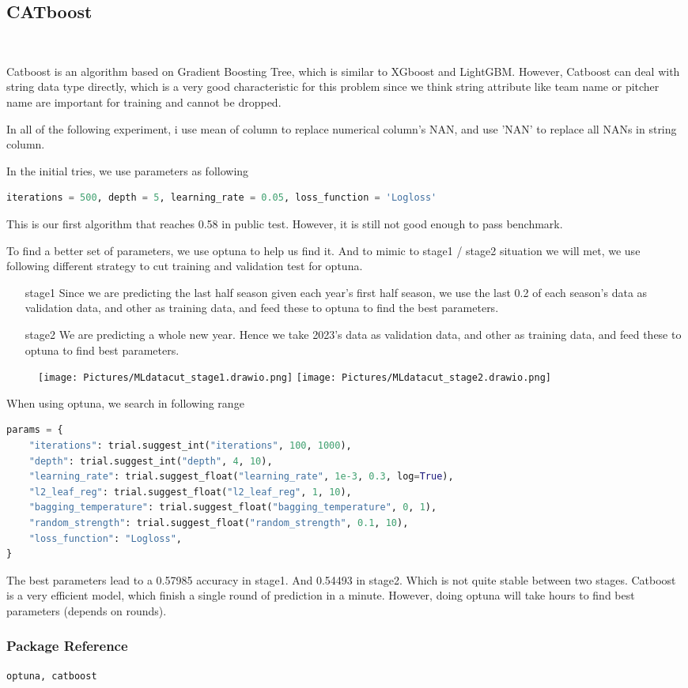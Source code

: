 \subsection*{CATboost}
\ \par Catboost is an algorithm based on Gradient Boosting Tree, which is similar to XGboost and LightGBM. However, Catboost can deal with string data type directly, which is a very good characteristic for this problem since we think string attribute like team name or pitcher name are important for training and cannot be dropped. 
\par In all of the following experiment, i use mean of column to replace numerical column's NAN, and use 'NAN' to replace all NANs in string column. 
\par In the initial tries, we use parameters as following
\begin{lstlisting}[language=Python]
iterations = 500, depth = 5, learning_rate = 0.05, loss_function = 'Logloss'
\end{lstlisting}
\par This is our first algorithm that reaches 0.58 in public test. However, it is still not good enough to pass benchmark. 
\par To find a better set of parameters, we use optuna to help us find it. And to mimic to stage1 / stage2 situation we will met, we use following different strategy to cut training and validation test for optuna.
\begin{itemize}
    \item[stage1] Since we are predicting the last half season given each year's first half season, we use the last 0.2 of each season's data as validation data, and other as training data, and feed these to optuna to find the best parameters.
    \item[stage2] We are predicting a whole new year. Hence we take 2023's data as validation data, and other as training data, and feed these to optuna to find best parameters.
\end{itemize}
\begin{figure}[h]
    \centering
    \texttt{[image: Pictures/MLdatacut\_stage1.drawio.png]}
    \texttt{[image: Pictures/MLdatacut\_stage2.drawio.png]}
\end{figure}
\par When using optuna, we search in following range
\begin{lstlisting}[language=Python]
params = {
    "iterations": trial.suggest_int("iterations", 100, 1000),
    "depth": trial.suggest_int("depth", 4, 10),
    "learning_rate": trial.suggest_float("learning_rate", 1e-3, 0.3, log=True),
    "l2_leaf_reg": trial.suggest_float("l2_leaf_reg", 1, 10),
    "bagging_temperature": trial.suggest_float("bagging_temperature", 0, 1),
    "random_strength": trial.suggest_float("random_strength", 0.1, 10),
    "loss_function": "Logloss",
}
\end{lstlisting}
The best parameters lead to a 0.57985 accuracy in stage1. And 0.54493 in stage2. Which is not quite stable between two stages. Catboost is a very efficient model, which finish a single round of prediction in a minute. However, doing optuna will take hours to find best parameters (depends on rounds). 
\subsubsection*{Package Reference}
\begin{lstlisting}
optuna, catboost
\end{lstlisting}